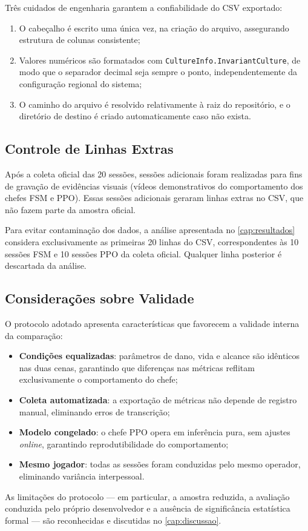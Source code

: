 Três cuidados de engenharia garantem a confiabilidade do CSV exportado:

\begin{enumerate}
    \item O cabeçalho é escrito uma única vez, na criação do arquivo,
          assegurando estrutura de colunas consistente;
    \item Valores numéricos são formatados com
          \texttt{CultureInfo.InvariantCulture}, de modo que o separador
          decimal seja sempre o ponto, independentemente da configuração
          regional do sistema;
    \item O caminho do arquivo é resolvido relativamente à raiz do
          repositório, e o diretório de destino é criado automaticamente
          caso não exista.
\end{enumerate}

\subsection{Controle de Linhas Extras}
\label{subsec:controle-linhas}

Após a coleta oficial das 20 sessões, sessões adicionais foram realizadas
para fins de gravação de evidências visuais (vídeos demonstrativos do
comportamento dos chefes FSM e PPO). Essas sessões adicionais geraram linhas
extras no CSV, que não fazem parte da amostra oficial.

Para evitar contaminação dos dados, a análise apresentada no
\autoref{cap:resultados} considera exclusivamente as primeiras 20 linhas do
CSV, correspondentes às 10 sessões FSM e 10 sessões PPO da coleta oficial.
Qualquer linha posterior é descartada da análise.

\subsection{Considerações sobre Validade}
\label{subsec:validade}

O protocolo adotado apresenta características que favorecem a validade interna
da comparação:

\begin{itemize}
    \item \textbf{Condições equalizadas}: parâmetros de dano, vida e alcance
          são idênticos nas duas cenas, garantindo que diferenças nas
          métricas reflitam exclusivamente o comportamento do chefe;
    \item \textbf{Coleta automatizada}: a exportação de métricas não depende
          de registro manual, eliminando erros de transcrição;
    \item \textbf{Modelo congelado}: o chefe PPO opera em inferência pura, sem
          ajustes \textit{online}, garantindo reprodutibilidade do
          comportamento;
    \item \textbf{Mesmo jogador}: todas as sessões foram conduzidas pelo
          mesmo operador, eliminando variância interpessoal.
\end{itemize}

As limitações do protocolo --- em particular, a amostra reduzida, a avaliação
conduzida pelo próprio desenvolvedor e a ausência de significância estatística
formal --- são reconhecidas e discutidas no \autoref{cap:discussao}.
